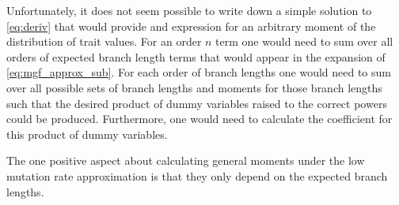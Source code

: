 Unfortunately, it does not seem possible to write down a simple solution to
\eqref{eq:deriv} that would provide and expression for an arbitrary moment of
the distribution of trait values. For an order $n$ term one would need to sum
over all orders of expected branch length terms that would appear in the
expansion of \eqref{eq:mgf_approx_sub}. For each order of branch lengths one
would need to sum over all possible sets of branch lengths and moments for those
branch lengths such that the desired product of dummy variables raised to the
correct powers could be produced. Furthermore, one would need to calculate the
coefficient for this product of dummy variables.

The one positive aspect about calculating general moments under the low mutation
rate approximation is that they only depend on the expected branch lengths.

